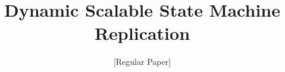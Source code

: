 \documentclass[conference]{IEEEtran}
\newcommand{\dssmrlong}{Dynamic Scalable State Machine Replication}
\begin{document}
\title{\dssmrlong}

\author{[Regular Paper]\\\vspace{20pt}}



\maketitle
\thispagestyle{plain}
\pagestyle{plain}
%











%


\newpage
\end{document}

